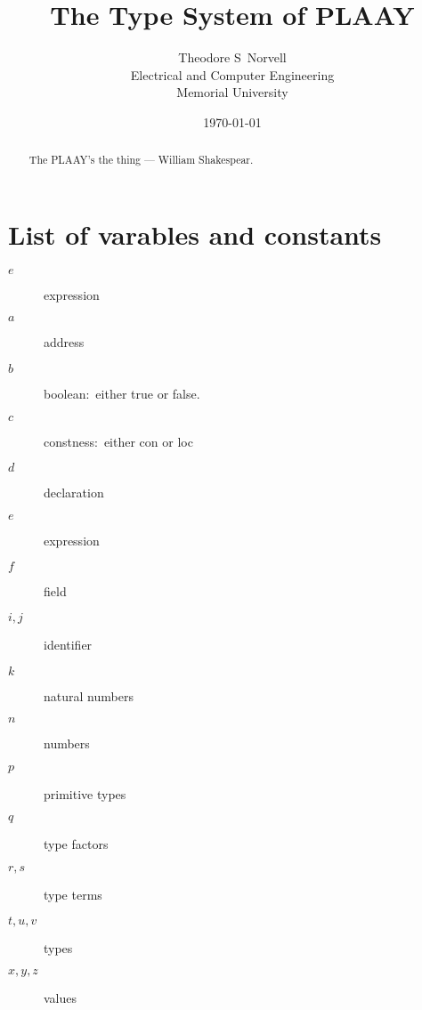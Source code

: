 \documentclass[12pt]{article}
\begin{document}
\title{The Type System of PLAAY}
\author{Theodore S\ Norvell \\
Electrical and Computer Engineering\\
Memorial University}
\date{\today}
\maketitle

\begin{abstract}
The PLAAY's the thing --- William Shakespear.
\end{abstract}

\tableofcontents

\section*{List of varables and constants}%

\begin{description}
\item[$e$] expression

\item[$a$] address

\item[$b$] boolean:\ either \textsf{true} or \textsf{false}.

\item[$c$] constness:\ either \textsf{con} or \textsf{loc}

\item[$d$] declaration

\item[$e$] expression

\item[$f$] field

\item[$i,j$] identifier

\item[$k$] natural numbers

\item[$n$] numbers

\item[$p$] primitive types

\item[$q$] type factors

\item[$r,s$] type terms

\item[$t,u,v$] types

\item[$x,y,z$] values
\end{description}
\end{document}

